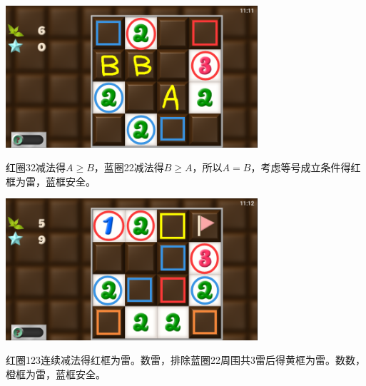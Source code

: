 \subsection{} %
\begin{center}
    \includegraphics[width=0.7\textwidth]{puzzle/128-1.png}
\end{center}
红圈32减法得$A\ge B$，蓝圈22减法得$B\ge A$，所以$A=B$，考虑等号成立条件得红框为雷，蓝框安全。
\begin{center}
    \includegraphics[width=0.7\textwidth]{puzzle/128-2.png}
\end{center}
红圈123连续减法得红框为雷。数雷，排除蓝圈22周围共3雷后得黄框为雷。数数，橙框为雷，蓝框安全。

